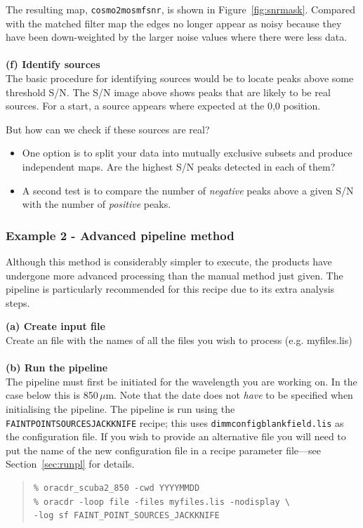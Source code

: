 \documentclass[twoside,11pt]{article}
\newcommand{\htmlref}[2]{#1}
\newcommand{\latexhtml}[2]{#1}
\newcommand{\xref}[3]{#1}
\renewcommand{\_}{\texttt{\symbol{95}}}
\newenvironment{myquote}{\begin{quote}\begin{small}}{\end{small}\end{quote}}
\newcommand{\drrecipe}[1]{\texttt{#1}}
\newcommand{\cref}[3]{\latexhtml{#1~\ref{#2}}{\htmlref{#3}{#2}}}
\begin{document}
The resulting map, \texttt{cosmo2\_mos\_mf\_snr}, is shown in
\cref{Figure}{fig:snrmask}{signal-to-noise image}. Compared with the
matched filter map the
edges no longer appear as noisy because they have been down-weighted
by the larger noise values where there were less data.
\\ \\
\textbf{(f) Identify sources}\\
The basic procedure for identifying sources would be to locate peaks
above some threshold S/N. The S/N image above shows peaks that are
likely to be real sources. For a start, a source appears where
expected at the 0,0 position.

But how can we check if these sources are real?
\begin{itemize}

\item One option is to split your data into mutually exclusive subsets
  and produce independent maps. Are the highest S/N peaks detected in each of
  them?
\item A second test is to compare the number of \emph{negative} peaks above
  a given S/N with the number of \emph{positive} peaks.
\end{itemize}

\subsubsection{Example 2 - Advanced pipeline method}
\label{sec:jk}

Although this method is considerably simpler to execute, the products
have undergone more advanced processing than the manual method just
given. The pipeline is particularly recommended for this recipe due to
its extra analysis steps.

\textbf{(a) Create input file}\\
Create an file with the names of all the files you wish to process (e.g. myfiles.lis)
\\ \\
\textbf{(b) Run the pipeline}\\
The pipeline must first be initiated for the wavelength you are
working on. In the case below this is 850\,$\mu$m. Note that the date
does not \emph{have} to be specified when initialising the pipeline.
The pipeline is run using the
\xref{\drrecipe{FAINT\_POINT\_SOURCES\_JACKKNIFE}}{sun265}{FAINT_POINT_SOURCES_JACKKNIFE}
recipe; this uses \texttt{dimmconfig\_blank\_field.lis} as the
configuration file. If you wish to provide an alternative file you
will need to put the name of the new configuration file in a recipe
parameter file---see \cref{Section}{sec:runpl}{The SCUBA-2 Pipeline}
for details.
\begin{myquote}
\begin{verbatim}
% oracdr_scuba2_850 -cwd YYYYMMDD
% oracdr -loop file -files myfiles.lis -nodisplay \
-log sf FAINT_POINT_SOURCES_JACKKNIFE
\end{verbatim}
\end{myquote}
\end{document}
